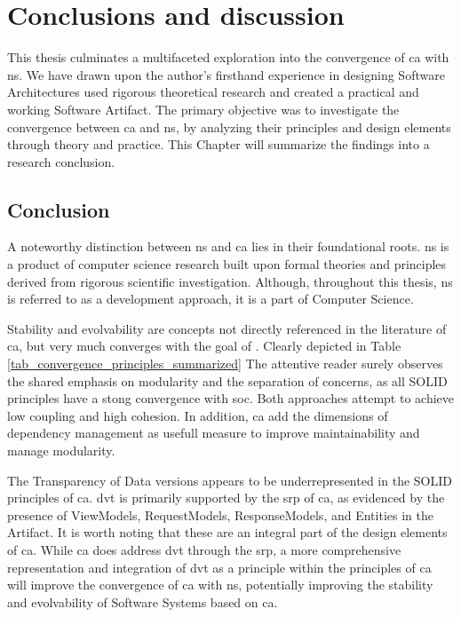 \chapter{Conclusions and discussion} \label{chap_conclusions}

This thesis culminates a multifaceted exploration into the convergence of \gls{ca} with
\gls{ns}. We have drawn upon the author's firsthand experience in designing Software
Architectures used rigorous theoretical research and created a practical and working
Software Artifact. The primary objective was to investigate the convergence between \gls{ca}
and \gls{ns}, by analyzing their principles and design elements through theory and
practice. This Chapter will summarize the findings into a research conclusion.

\section{Conclusion}

A noteworthy distinction between \gls{ns} and \gls{ca} lies in their foundational roots.
\gls{ns} is a product of computer science research built upon formal theories and
principles derived from rigorous scientific investigation. Although, throughout this
thesis, \gls{ns} is referred to as a development approach, it is a part of Computer
Science.

Stability and evolvability are concepts not directly referenced in the literature of
\gls{ca}, but very much converges with the goal of \textcite[31]{mannaert_normalized_2016}.
Clearly depicted in Table \ref{tab_convergence_principles_summarized} The attentive reader
surely observes the shared emphasis on modularity and the separation of concerns, as all
SOLID principles have a stong convergence with \gls{soc}. Both approaches attempt to
achieve low coupling and high cohesion. In addition, \gls{ca} add the dimensions of
dependency management as usefull measure to improve maintainability and manage modularity.

The Transparency of Data versions appears to be underrepresented in the SOLID principles
of \gls{ca}. \gls{dvt} is primarily supported by the \gls{srp} of \gls{ca}, as evidenced
by the presence of ViewModels, RequestModels, ResponseModels, and Entities in the
Artifact. It is worth noting that these are an integral part of the design elements of
\gls{ca}. While \gls{ca} does address \gls{dvt} through the \gls{srp}, a more
comprehensive representation and integration of \gls{dvt} as a principle within the
principles of \gls{ca} will improve the convergence of \gls{ca} with \gls{ns}, potentially
improving the stability and evolvability of Software Systems based on \gls{ca}.

